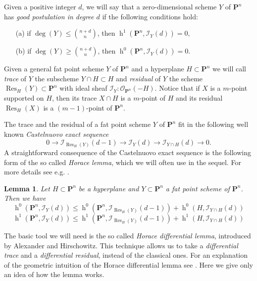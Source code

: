 \documentclass{amsart}
\theoremstyle{plain}
\newtheorem{lemma}[theorem]{Lemma}
\theoremstyle{definition}
\begin{document}
Given a positive integer $d$, we will say that a zero-dimensional
scheme $Y$ of ${\mathbf P}^n$ has {\em good postulation in degree $d$} if the following
conditions hold:
\begin{enumerate}
\item[(a)]
if $\deg(Y) \le \binom{n+d}{n}$, then
$\operatorname{h}^1({\mathbf P}^n,\mathcal{I}_{Y}(d))=0,$
\item[(b)] if $\deg(Y) \ge\binom{n+d}{n}$, then
$\operatorname{h}^0({\mathbf P}^n,\mathcal {I}_{Y}(d))=0.$
\end{enumerate}

Given a general fat point scheme $Y$ of ${\mathbf P}^n$ and a hyperplane
$H\subset{\mathbf P}^n$ we will call {\em trace} of $Y$ the subscheme $Y\cap
H\subset H$ and {\em residual} of $Y$ the scheme $\operatorname{Res}_H(Y)\subset{\mathbf P}^n$ with
ideal sheaf ${\mathcal{I}}_Y:\mathcal{O}_{{\mathbf P}^n}(-H)$.
Notice that if $X$ is a $m$-point supported on $H$, then its trace
$X\cap H$ is a $m$-point of $H$ and its residual $\operatorname{Res}_H(X)$ is a
$(m-1)$-point of ${\mathbf P}^n$.

The trace and the residual of a fat point scheme $Y$ of ${\mathbf P}^n$ fit in the
following well known {\em Castelnuovo exact sequence}
$$0\to {\mathcal{I}}_{\operatorname{Res}_H(Y)}(d-1)\to {\mathcal{I}}_Y(d)\to {\mathcal{I}}_{Y\cap H}(d)\to 0.$$
A straightforward consequence of the Castelnuovo exact sequence is the
following form of the so called {\em Horace lemma},
which we will often use in the sequel. For more details see e.g. \cite[Section 4]{BO}.

\begin{lemma}\label{castelnuovo}
Let $H\subset {\mathbf P}^n$ be a hyperplane and $Y\subset {\mathbf P}^n$ a fat point scheme of ${\mathbf P}^n$.
Then we have
$$ \operatorname{h}^0({\mathbf P}^n,{\mathcal{I}}_Y(d))\le
\operatorname{h}^0({\mathbf P}^n,{\mathcal{I}}_{\operatorname{Res}_H(Y)}(d-1))+\operatorname{h}^0(H,{\mathcal{I}}_{Y\cap H}(d))$$
$$ \operatorname{h}^1({\mathbf P}^n,{\mathcal{I}}_Y(d))\le
\operatorname{h}^1({\mathbf P}^n,{\mathcal{I}}_{\operatorname{Res}_H(Y)}(d-1))+\operatorname{h}^1(H,{\mathcal{I}}_{Y\cap H}(d))$$
\end{lemma}

The basic tool we will need is the so called {\em Horace differential
lemma}, introduced by Alexander and Hirschowitz. This technique allows us to take a {\em differential trace}
and a {\em differential residual}, instead of the classical ones.
For an explanation of the geometric intuition of the Horace
differential lemma see \cite[Section 2.1]{AH}. Here we give only an
idea of how the lemma works.
\end{document}
